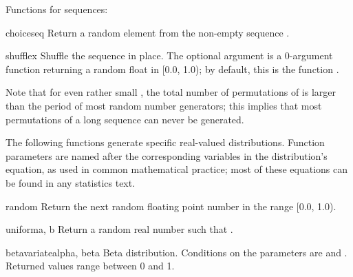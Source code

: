 Functions for sequences:

\begin{funcdesc}{choice}{seq}
  Return a random element from the non-empty sequence .
\end{funcdesc}

\begin{funcdesc}{shuffle}{x}
  Shuffle the sequence  in place.
  The optional argument  is a 0-argument function
  returning a random float in [0.0, 1.0); by default, this is the
  function .

  Note that for even rather small , the total
  number of permutations of  is larger than the period of most
  random number generators; this implies that most permutations of a
  long sequence can never be generated.
\end{funcdesc}


The following functions generate specific real-valued distributions.
Function parameters are named after the corresponding variables in the
distribution's equation, as used in common mathematical practice; most of
these equations can be found in any statistics text.

\begin{funcdesc}{random}{}
  Return the next random floating point number in the range [0.0, 1.0).
\end{funcdesc}

\begin{funcdesc}{uniform}{a, b}
  Return a random real number  such that
  .
\end{funcdesc}

\begin{funcdesc}{betavariate}{alpha, beta}
  Beta distribution.  Conditions on the parameters are
   and .
  Returned values range between 0 and 1.
\end{funcdesc}



